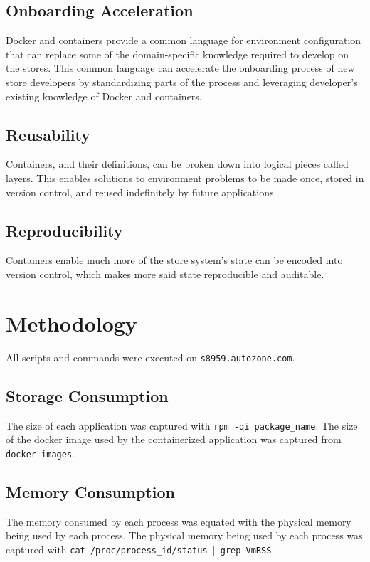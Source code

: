 \documentclass{article}
\begin{document}
\subsection{Onboarding Acceleration}
Docker and containers provide a common language for environment configuration that can replace some of the domain-specific knowledge required to develop on the stores. This common language can accelerate the onboarding process of new store developers by standardizing parts of the process and leveraging developer's existing knowledge of Docker and containers.

\subsection{Reusability}
Containers, and their definitions, can be broken down into logical pieces called layers. This enables solutions to environment problems to be made once, stored in version control, and reused indefinitely by future applications.

\subsection{Reproducibility}
Containers enable much more of the store system's state can be encoded into version control, which makes more said state reproducible and auditable.

\section{Methodology}
All scripts and commands were executed on \texttt{s8959.autozone.com}.

\subsection{Storage Consumption}
The size of each application was captured with \texttt{rpm -qi package\_name}. The size of the docker image used by the containerized application was captured from \texttt{docker images}.

\subsection{Memory Consumption}
The memory consumed by each process was equated with the physical memory being used by each process. The physical memory being used by each process was captured with \texttt{cat /proc/process\_id/status $|$ grep VmRSS}.
\end{document}
